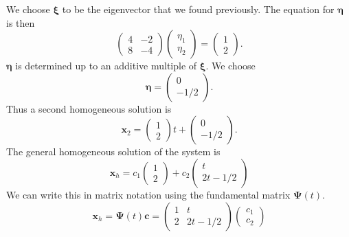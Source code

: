 \begin{Solution}
\[  \]
  We choose $\boldsymbol{\xi}$ to be the eigenvector that we found previously.  The equation
  for $\boldsymbol{\eta}$ is then
  \[
  \begin{pmatrix}
    4 & -2 \\
    8 & -4
  \end{pmatrix}
  \begin{pmatrix}
    \eta_1 \\
    \eta_2
  \end{pmatrix}
  =
  \begin{pmatrix}
    1 \\
    2
  \end{pmatrix}.
  \]
  $\boldsymbol{\eta}$ is determined up to an additive multiple of $\boldsymbol{\xi}$.  We choose
  \[
  \boldsymbol{\eta} = 
  \begin{pmatrix}
    0 \\
    -1/2
  \end{pmatrix}.
  \]
  Thus a second homogeneous solution is
  \[
  \mathbf{x}_2 = 
  \begin{pmatrix}
    1 \\
    2
  \end{pmatrix} t + 
  \begin{pmatrix}
    0 \\
    -1/2
  \end{pmatrix}.
  \]
  The general homogeneous solution of the system is
  \[
  \mathbf{x}_h =
  c_1
  \begin{pmatrix}
    1 \\
    2
  \end{pmatrix}  + 
  c_2 
  \begin{pmatrix}
    t \\
    2 t -1/2
  \end{pmatrix} 
  \]
  We can write this in matrix notation using the fundamental matrix
  $\boldsymbol{\Psi}(t)$.
  \[
  \mathbf{x}_h = \boldsymbol{\Psi}(t) \mathbf{c} =
  \begin{pmatrix}
    1 & t  \\
    2 & 2 t - 1/2
  \end{pmatrix} 
  \begin{pmatrix}
    c_1 \\
    c_2
  \end{pmatrix} 
  \]



\end{Solution}
